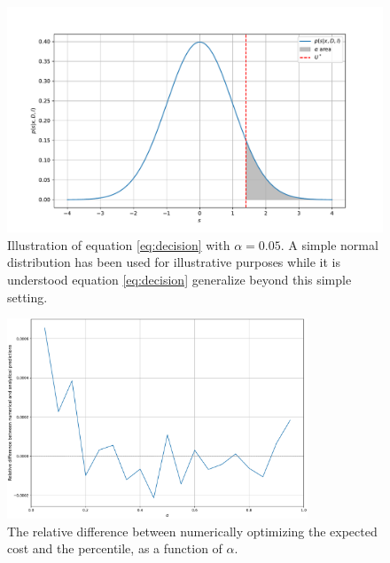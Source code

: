 \documentclass[a4paper,12pt]{article}
\theoremstyle{definition}
\begin{document}
	\begin{figure}[H]
		\centering
		\includegraphics[width = 1\textwidth]{figures/alpha_plot.pdf}
		\caption{Illustration of equation \eqref{eq:decision} with $\alpha = 0.05$. A simple normal distribution has been used for illustrative purposes while it is understood equation \eqref{eq:decision} generalize beyond this simple setting.}
		\label{fig:2}
	\end{figure}
	\begin{figure}[H]
		\centering
		\includegraphics[width = 0.8\textwidth]{figures/numerical_example.pdf}
		\caption{The relative difference between numerically optimizing the expected cost and the percentile, as a function of $\alpha$.}
		\label{fig:3}
	\end{figure}
	
	
	
	
	
\end{document}
